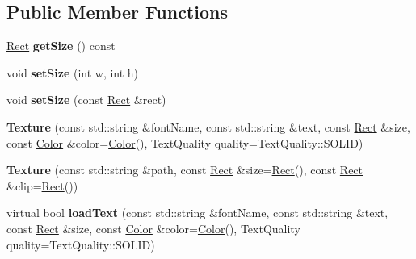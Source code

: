 \subsection*{Public Member Functions}
\begin{DoxyCompactItemize}
\item 
\mbox{\label{classbkengine_1_1Texture_aabea3eecbe16a0e44a280ed2ec1edb45}} 
\hyperlink{structbkengine_1_1Rect}{Rect} {\bfseries get\+Size} () const
\item 
\mbox{\label{classbkengine_1_1Texture_a68e73d6b3c30050ef410240b2de32fea}} 
void {\bfseries set\+Size} (int w, int h)
\item 
\mbox{\label{classbkengine_1_1Texture_ad98c098ac51603405b2e8cb3237b5763}} 
void {\bfseries set\+Size} (const \hyperlink{structbkengine_1_1Rect}{Rect} \&rect)
\item 
\mbox{\label{classbkengine_1_1Texture_a8b423c07980bfa1dbc54322bb6a65fbd}} 
{\bfseries Texture} (const std\+::string \&font\+Name, const std\+::string \&text, const \hyperlink{structbkengine_1_1Rect}{Rect} \&size, const \hyperlink{structbkengine_1_1Color}{Color} \&color=\hyperlink{structbkengine_1_1Color}{Color}(), Text\+Quality quality=Text\+Quality\+::\+S\+O\+L\+ID)
\item 
\mbox{\label{classbkengine_1_1Texture_a582d3c6b791a0da39cf5956fafa81801}} 
{\bfseries Texture} (const std\+::string \&path, const \hyperlink{structbkengine_1_1Rect}{Rect} \&size=\hyperlink{structbkengine_1_1Rect}{Rect}(), const \hyperlink{structbkengine_1_1Rect}{Rect} \&clip=\hyperlink{structbkengine_1_1Rect}{Rect}())
\item 
\mbox{\label{classbkengine_1_1Texture_a3e67decde84b36228e612bd4a9f0a19c}} 
virtual bool {\bfseries load\+Text} (const std\+::string \&font\+Name, const std\+::string \&text, const \hyperlink{structbkengine_1_1Rect}{Rect} \&size, const \hyperlink{structbkengine_1_1Color}{Color} \&color=\hyperlink{structbkengine_1_1Color}{Color}(), Text\+Quality quality=Text\+Quality\+::\+S\+O\+L\+ID)
\item 
\mbox{\label{classbkengine_1_1Texture_a880fcd8dda876cb2c16390f079d8b99a}} 

\end{DoxyCompactItemize}
